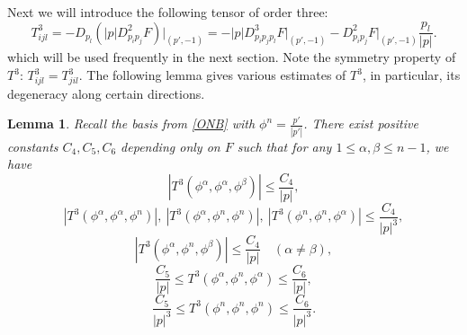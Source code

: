 \documentclass[12pt]{article}
\numberwithin{equation}{section}
\theoremstyle{plain}
\newtheorem{lemma}[theorem]{Lemma}
\theoremstyle{definition}
\theoremstyle{remark}
\begin{document}
Next we will introduce the following tensor of order three: 
\begin{equation} \label{eq:def:T3}
    T^3_{ijl} = -D_{p_l} \left(|p| D^2_{p_i p_j} F\right)\Big|_{(p',-1)} 
    = -|p| D^3_{p_i p_j p_l} F\Big|_{(p',-1)} - D^2_{p_i p_j} F\Big|_{(p',-1)} \frac{p_l}{|p|} .
\end{equation}
which will be used frequently in the next section.
Note the symmetry property of $T^3$: $T^3_{ijl} = T^3_{jil}$.
The following lemma gives various estimates of $T^3$, in particular, its 
degeneracy along certain directions.
\begin{lemma} \label{lem:2.4}
Recall the basis from \eqref{ONB} with $\phi^n = \frac{p'}{|p'|}$. There exist positive constants $C_4, C_5, C_6$ depending only on $F$ such that for any $1\leq \alpha,\beta \leq n-1$, we have 
\begin{equation*}
    |T^3 (\phi^{\alpha}, \phi^{\alpha}, \phi^{\beta})| \leq \frac{C_4}{|p|},
\end{equation*}
\begin{equation*}
     |T^3 (\phi^{\alpha}, \phi^{\alpha}, \phi^{n})|,\ |T^3 (\phi^{\alpha}, \phi^n, \phi^n)|, \  |T^3 (\phi^{n}, \phi^{n}, \phi^{\alpha})| \leq \frac{C_4}{|p|^3},
\end{equation*}
\begin{equation*}
    | T^3 (\phi^{\alpha}, \phi^n, \phi^{\beta})| \leq \frac{C_4}{|p|} \quad (\alpha\neq \beta),
\end{equation*}
\begin{equation*}
     \frac{C_5}{|p|} \leq T^3 (\phi^{\alpha}, \phi^n, \phi^{\alpha}) \leq \frac{C_6}{|p|},
\end{equation*}
\begin{equation*}
\frac{C_5}{|p|^3} \leq T^3 (\phi^{n}, \phi^{n}, \phi^n)  \leq \frac{C_6}{|p|^3}.
\end{equation*}
\end{lemma}
\end{document}
